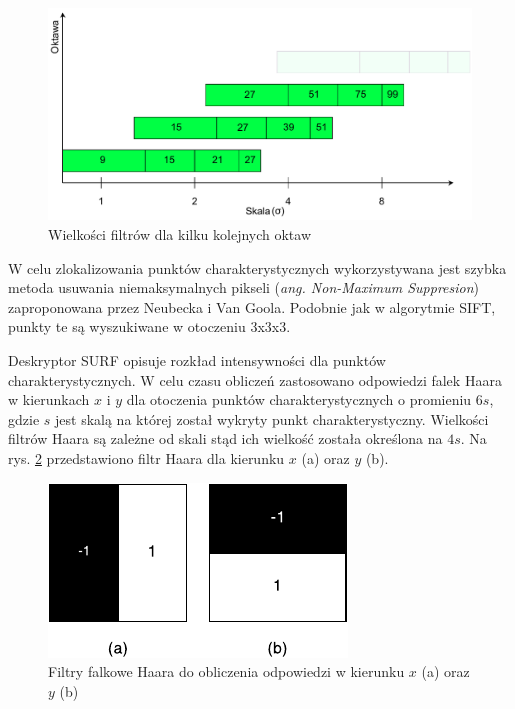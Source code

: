 \begin{figure}[h]
	\centering
	\includegraphics[scale=0.7]{graphics/01_podstawy_teoretyczne/surf-octaves.pdf}
	\caption{Wielkości filtrów dla kilku kolejnych oktaw \cite{BAY08}}
	\label{fig:surf-octaves}
\end{figure}

W celu zlokalizowania punktów charakterystycznych wykorzystywana jest szybka metoda usuwania niemaksymalnych pikseli (\emph{ang. Non-Maximum Suppresion}) zaproponowana przez Neubecka i Van Goola\cite{NEUBECK06}. Podobnie jak w algorytmie SIFT, punkty te są wyszukiwane w otoczeniu 3x3x3.

Deskryptor SURF opisuje rozkład intensywności dla punktów charakterystycznych. W celu czasu obliczeń zastosowano odpowiedzi falek Haara w kierunkach $x$ i $y$ dla otoczenia punktów charakterystycznych o promieniu $6s$, gdzie $s$ jest skalą na której został wykryty punkt charakterystyczny. Wielkości filtrów Haara są zależne od skali stąd ich wielkość została określona na $4s$. Na rys. \ref{fig:surf-haar-wavelet} przedstawiono filtr Haara dla kierunku $x$ (a) oraz $y$ (b).

\begin{figure}[h]
	\centering
	\includegraphics[scale=1.5]{graphics/01_podstawy_teoretyczne/surf-haar-wavelet.pdf}
	\caption{Filtry falkowe Haara do obliczenia odpowiedzi w kierunku $x$ (a) oraz $y$ (b) \cite{BAY08}}
	\label{fig:surf-haar-wavelet}
\end{figure}

